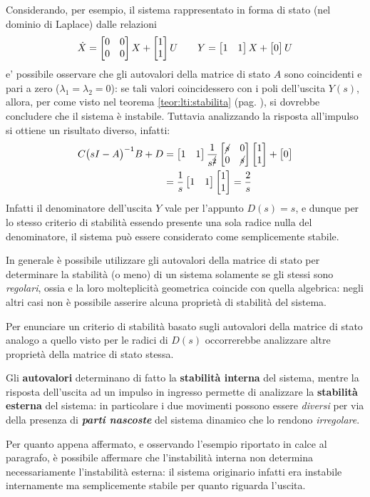 		Considerando, per esempio, il sistema rappresentato in forma di stato (nel dominio di Laplace) dalle relazioni
		\[ \dot X= \begin{bmatrix} 0 & 0 \\ 0 & 0 \end{bmatrix} X + \begin{bmatrix} 1 \\ 1 \end{bmatrix}U \qquad Y = \begin{bmatrix} 1 & 1 \end{bmatrix} X + \begin{bmatrix} 0 \end{bmatrix}U \]
		e' possibile osservare che gli autovalori della matrice di stato $A$ sono coincidenti e pari a zero ($\lambda_1 = \lambda_2 = 0$): se tali valori coincidessero con i poli dell'uscita $Y(s)$, allora, per come visto nel teorema \ref{teor:lti:stabilita} (pag. \pageref{teor:lti:stabilita}), si dovrebbe concludere che il sistema è instabile. Tuttavia analizzando la risposta all'impulso si ottiene un risultato diverso, infatti:
		\begin{align*}
			C\big(sI-A\big)^{-1} B + D & = \begin{bmatrix} 1 & 1  \end{bmatrix} \frac 1 {s^{\cancel{2}}} \begin{bmatrix} \cancel s & 0 \\ 0 & \cancel s \end{bmatrix} \begin{bmatrix} 1 \\ 1 \end{bmatrix} + \begin{bmatrix} 0 \end{bmatrix} \\
			& = \frac 1 s \begin{bmatrix} 1 & 1 \end{bmatrix} \begin{bmatrix} 1 \\ 1 \end{bmatrix} = \frac 2 s
		\end{align*}
		Infatti il denominatore dell'uscita $Y$ vale per l'appunto $D(s) = s$, e dunque per lo stesso criterio di stabilità essendo presente una sola radice nulla del denominatore, il sistema può essere considerato come semplicemente stabile.
		
		\begin{concetto}
			In generale è possibile utilizzare gli autovalori della matrice di stato per determinare la stabilità (o meno) di un sistema solamente se gli stessi sono \textit{regolari}, ossia e la loro molteplicità geometrica coincide con quella algebrica: negli altri casi non è possibile asserire alcuna proprietà di stabilità del sistema.
		\end{concetto}
		Per enunciare un criterio di stabilità basato sugli autovalori della matrice di stato analogo a quello visto per le radici di $D(s)$ occorrerebbe analizzare altre proprietà della matrice di stato stessa.
		
		\begin{concetto}
			Gli \textbf{autovalori} determinano di fatto la \textbf{stabilità interna} del sistema, mentre la risposta dell'uscita ad un impulso in ingresso permette di analizzare la \textbf{stabilità esterna} del sistema: in particolare i due movimenti possono essere \textit{diversi} per via della presenza di \textbf{\textit{parti nascoste}} del sistema dinamico che lo rendono \textit{irregolare}.
		\end{concetto}
		\begin{osservazione}
			Per quanto appena affermato, e osservando l'esempio riportato in calce al paragrafo, è possibile affermare che l'instabilità interna non determina necessariamente l'instabilità esterna: il sistema originario infatti era instabile internamente ma semplicemente stabile per quanto riguarda l'uscita.
		\end{osservazione}
		
